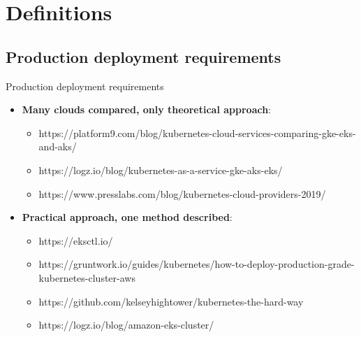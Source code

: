 \documentclass{beamer}
\begin{document}
\section {Definitions}
\subsection{Production deployment requirements}
\begin{frame}{Production deployment requirements}%
\begin{itemize}
	\item \textbf{Many clouds compared, only theoretical approach}:
	\begin{itemize}
		\item https://platform9.com/blog/kubernetes-cloud-services-comparing-gke-eks-and-aks/
		\item https://logz.io/blog/kubernetes-as-a-service-gke-aks-eks/
		\item https://www.presslabs.com/blog/kubernetes-cloud-providers-2019/
	\end{itemize}
	\item \textbf{Practical approach, one method described}:
	\begin{itemize}
		\item https://eksctl.io/
		\item https://gruntwork.io/guides/kubernetes/how-to-deploy-production-grade-kubernetes-cluster-aws
		\item https://github.com/kelseyhightower/kubernetes-the-hard-way
		\item https://logz.io/blog/amazon-eks-cluster/
	\end{itemize}
\end{itemize}
\end{frame}
\end{document}
